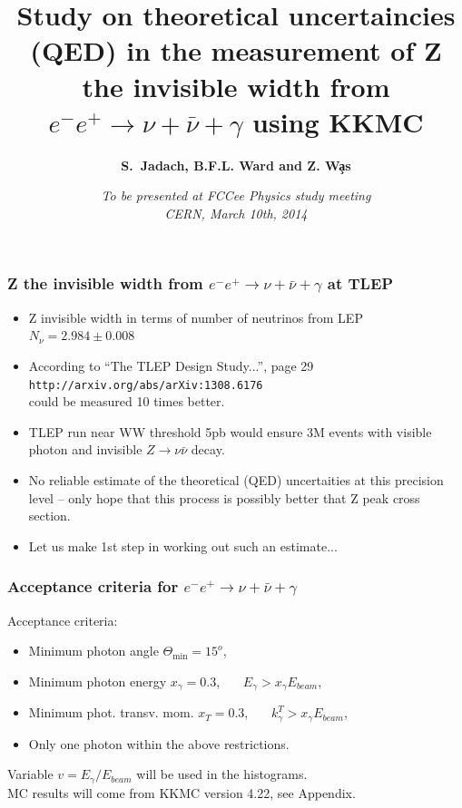 \documentclass{beamer}
\title[Monte Carlo Methods] %
{ {\bf Study on theoretical uncertaincies (QED) in the measurement
  of Z the invisible width from 
  $e^-e^+\to\nu+\bar\nu+\gamma$ using KKMC}
} %
\author[S.~Jadach] %
{\bf S.~Jadach,  B.F.L. Ward and Z. W\c{a}s}
\institute[Universities of Somewhere and Elsewhere] %
{ {\large\crd IFJ-PAN, Krak\'ow, Poland}\\
  {~~~}\\
  {\footnotesize
  Partly supported by Polish Government grant\\
  {\em Narodowe Centrum Nauki} DEC-2011/03/B/ST2/02632
}}
\date[Short Occasion] %
{\em To be presented at FCCee Physics study meeting\\
     CERN, March 10th, 2014
}
\begin{document}
\begin{frame}
  \titlepage
\end{frame}

\begin{frame}[fragile]
\frametitle{\bf Z the invisible width from 
  $e^-e^+\to\nu+\bar\nu+\gamma$ at TLEP}
\small
\begin{itemize}
\item
Z invisible width in terms of number of neutrinos from LEP
$N_\nu = 2.984\pm0.008$
\item
According to ``The TLEP Design Study...'', page 29
{\tt http://arxiv.org/abs/arXiv:1308.6176}\\
could be measured 10 times better.
\item
TLEP run near WW threshold 5pb would ensure 3M events
with visible photon and invisible $Z\to \nu\bar\nu$ decay.
\item
No reliable estimate of the theoretical
(QED) uncertaities at this precision level --
only hope that this process is possibly 
better that Z peak cross section.
\item
Let us make 1st step in working out such an estimate...
\end{itemize}
\end{frame}

\begin{frame}[fragile]
\frametitle{\bf Acceptance criteria for $e^-e^+\to\nu+\bar\nu+\gamma$}
Acceptance criteria:
\begin{itemize}
\item
Minimum photon angle $\Theta_{\min}=15^o$,
\item
Minimum photon energy $x_\gamma=0.3$, ~~~$E_\gamma > x_\gamma E_{beam}$,
\item
Minimum phot. transv. mom. $x_T=0.3$, ~~~$k^T_\gamma > x_\gamma E_{beam}$,
\item
Only one photon within the above restrictions.
\end{itemize}
Variable $v=E_\gamma/E_{beam}$ will be used in the histograms.\\
MC results will come from KKMC version 4.22, see Appendix.

\end{frame}
\end{document}
